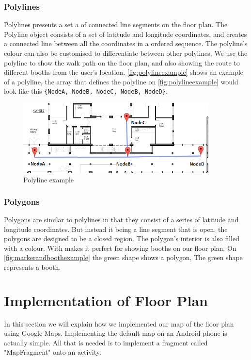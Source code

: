 \subsubsection*{Polylines}
Polylines presents a set a of connected line segments on the floor plan. The Polyline object consists of a set of latitude and longitude coordinates, and creates a connected line between all the coordinates in a ordered sequence. The polyline's colour can also be customised to differentiate between other polylines. We use the polyline to show the walk path on the floor plan, and also showing the route to different booths from the user's location. \autoref{fig:polylineexample} shows an example of a polyline, the array that defines the polyline on \autoref{fig:polylineexample} would look like this \lstinline|{NodeA, NodeB, NodeC, NodeB, NodeD}|.  
\begin{figure}[H]
\centering
\includegraphics[width=0.9\textwidth]{img/polylineExample.png}
\caption{Polyline example}
\label{fig:polylineexample}
\end{figure}

\subsubsection*{Polygons}
Polygons are similar to polylines in that they consist of a series of latitude and longitude coordinates. But instead it being a line segment that is open, the polygons are designed to be a closed region. The polygon's interior is also filled with a colour. With makes it perfect for showing booths on our floor plan.
On \autoref{fig:markerandboothexample} the green shape shows a polygon, The green shape represents a booth.

\section{Implementation of Floor Plan}
In this section we will explain how we implemented our map of the floor plan using Google Maps. Implementing the default map on an Android phone is actually simple. All that is needed is to implement a fragment called "MapFragment" onto an activity.

